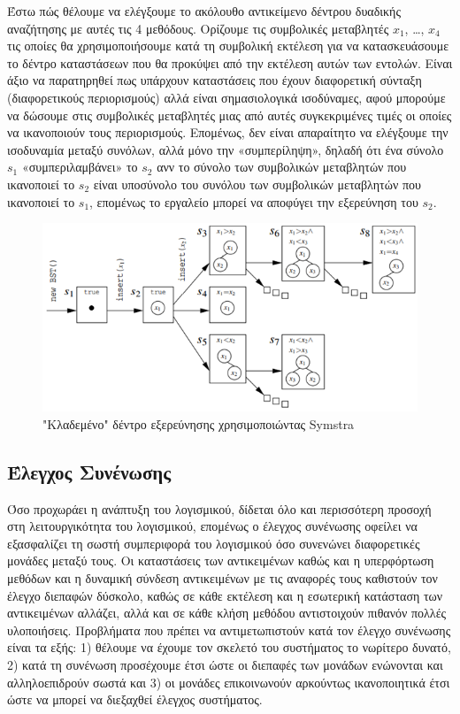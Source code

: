 \documentclass[12pt]{article}
\begin{document}
Έστω πώς θέλουμε να ελέγξουμε το ακόλουθο αντικείμενο δέντρου δυαδικής αναζήτησης με αυτές τις 4 μεθόδους. Ορίζουμε τις συμβολικές μεταβλητές $x_1$, …, $x_4$ τις οποίες θα χρησιμοποιήσουμε κατά τη συμβολική εκτέλεση για να κατασκευάσουμε το δέντρο καταστάσεων που θα προκύψει από την εκτέλεση αυτών των εντολών. Είναι άξιο να παρατηρηθεί πως υπάρχουν καταστάσεις που έχουν διαφορετική σύνταξη (διαφορετικούς περιορισμούς) αλλά είναι σημασιολογικά ισοδύναμες, αφού μπορούμε να δώσουμε στις συμβολικές μεταβλητές μιας από αυτές συγκεκριμένες τιμές οι οποίες να ικανοποιούν τους περιορισμούς. Επομένως, δεν είναι απαραίτητο να ελέγξουμε την ισοδυναμία μεταξύ συνόλων, αλλά μόνο την «συμπερίληψη», δηλαδή ότι ένα σύνολο $s_1$ «συμπεριλαμβάνει» το $s_2$ ανν το σύνολο των συμβολικών μεταβλητών που ικανοποιεί το $s_2$ είναι υποσύνολο του συνόλου των συμβολικών μεταβλητών που ικανοποιεί το $s_1$, επομένως το εργαλείο μπορεί να αποφύγει την εξερεύνηση του $s_2$.

\begin{figure}
\label{fig:symstra_example}
\caption{"Κλαδεμένο" δέντρο εξερεύνησης χρησιμοποιώντας Symstra}
\includegraphics[width=\textwidth,height=\textheight,keepaspectratio]{symstra_example.png}
\end{figure}

\subsection{Έλεγχος Συνένωσης} 

Όσο προχωράει η ανάπτυξη του λογισμικού, δίδεται όλο και περισσότερη προσοχή στη λειτουργικότητα του λογισμικού, επομένως ο έλεγχος συνένωσης οφείλει να εξασφαλίζει τη σωστή συμπεριφορά του λογισμικού όσο συνενώνει διαφορετικές μονάδες μεταξύ τους. Οι καταστάσεις των αντικειμένων καθώς και η υπερφόρτωση μεθόδων και η δυναμική σύνδεση αντικειμένων με τις αναφορές τους καθιστούν τον έλεγχο διεπαφών δύσκολο, καθώς σε κάθε εκτέλεση και η εσωτερική κατάσταση των αντικειμένων αλλάζει, αλλά και σε κάθε κλήση μεθόδου αντιστοιχούν πιθανόν πολλές υλοποιήσεις.
Προβλήματα που πρέπει να αντιμετωπιστούν κατά τον έλεγχο συνένωσης είναι τα εξής: 1) θέλουμε να έχουμε τον σκελετό του συστήματος το νωρίτερο δυνατό, 2) κατά τη συνένωση προσέχουμε έτσι ώστε οι διεπαφές των μονάδων ενώνονται και αλληλοεπιδρούν σωστά και 3) οι μονάδες επικοινωνούν αρκούντως ικανοποιητικά έτσι ώστε να μπορεί να διεξαχθεί έλεγχος συστήματος.
\cite{bashir}
\end{document}
